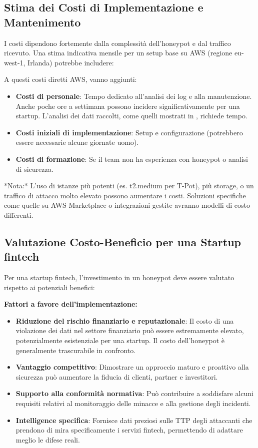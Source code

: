 \subsection{Stima dei Costi di Implementazione e Mantenimento}
\label{subsec:stima_costi}

I costi dipendono fortemente dalla complessità dell'honeypot e dal traffico ricevuto. Una stima indicativa mensile per un setup base su AWS (regione eu-west-1, Irlanda) potrebbe includere:


    

A questi costi diretti AWS, vanno aggiunti:

\begin{itemize}
    \item \textbf{Costi di personale}: Tempo dedicato all'analisi dei log e alla manutenzione. Anche poche ore a settimana possono incidere significativamente per una startup. L'analisi dei dati raccolti, come quelli mostrati in \cite{peiris_2024}, richiede tempo.
    \item \textbf{Costi iniziali di implementazione}: Setup e configurazione (potrebbero essere necessarie alcune giornate uomo).
    \item \textbf{Costi di formazione}: Se il team non ha esperienza con honeypot o analisi di sicurezza.
\end{itemize}

*Nota:* L'uso di istanze più potenti (es. t2.medium per T-Pot), più storage, o un traffico di attacco molto elevato possono aumentare i costi. Soluzioni specifiche come quelle su AWS Marketplace \cite{aws_marketplace} o integrazioni gestite \cite{rapid7, salient_2025} avranno modelli di costo differenti.

\subsection{Valutazione Costo-Beneficio per una Startup fintech}
\label{subsec:costo_beneficio}

Per una startup fintech, l'investimento in un honeypot deve essere valutato rispetto ai potenziali benefici:

\textbf{Fattori a favore dell'implementazione:}
\begin{itemize}
    \item \textbf{Riduzione del rischio finanziario e reputazionale}: Il costo di una violazione dei dati nel settore finanziario può essere estremamente elevato, potenzialmente esistenziale per una startup. Il costo dell'honeypot è generalmente trascurabile in confronto.
    \item \textbf{Vantaggio competitivo}: Dimostrare un approccio maturo e proattivo alla sicurezza può aumentare la fiducia di clienti, partner e investitori.
    \item \textbf{Supporto alla conformità normativa}: Può contribuire a soddisfare alcuni requisiti relativi al monitoraggio delle minacce e alla gestione degli incidenti.
    \item \textbf{Intelligence specifica}: Fornisce dati preziosi sulle TTP degli attaccanti che prendono di mira specificamente i servizi fintech, permettendo di adattare meglio le difese reali.
\end{itemize}

